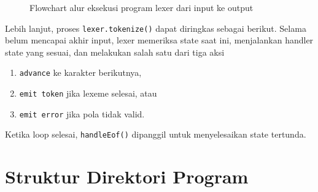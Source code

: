 \begin{figure}[H]
{
    }
    \caption{Flowchart alur eksekusi program lexer dari input ke output}
    \label{fig:flowchart-lexer-program}
\end{figure}

Lebih lanjut, proses \texttt{lexer.tokenize()} dapat diringkas sebagai berikut. Selama belum mencapai akhir input, lexer memeriksa state saat ini, menjalankan handler state yang sesuai, dan melakukan salah satu dari tiga aksi
\begin{enumerate}
    \item \texttt{advance} ke karakter berikutnya,
    \item \texttt{emit token} jika lexeme selesai, atau
    \item \texttt{emit error} jika pola tidak valid.
\end{enumerate}
Ketika loop selesai, \texttt{handleEof()} dipanggil untuk menyelesaikan state tertunda.

\section{Struktur Direktori Program}

